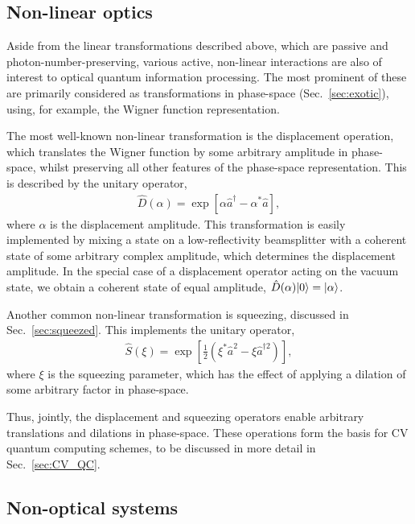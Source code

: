 %
%

\subsection{Non-linear optics} \label{sec:non_lin_opt} 

Aside from the linear transformations described above, which are passive and photon-number-preserving, various active, non-linear interactions are also of interest to optical quantum information processing. The most prominent of these are primarily considered as transformations in phase-space (Sec.~\ref{sec:exotic}), using, for example, the Wigner function representation.

The most well-known non-linear transformation is the displacement operation, which translates the Wigner function by some arbitrary amplitude in phase-space, whilst preserving all other features of the phase-space representation. This is described by the unitary operator,
\begin{align}
\hat{D}(\alpha) = \exp \left[\alpha\hat{a}^\dag - \alpha^*\hat{a}\right],
\end{align}
where $\alpha$ is the displacement amplitude. This transformation is easily implemented by mixing a state on a low-reflectivity beamsplitter with a coherent state of some arbitrary complex amplitude, which determines the displacement amplitude. In the special case of a displacement operator acting on the vacuum state, we obtain a coherent state of equal amplitude, \mbox{$\hat{D}(\alpha)|0\rangle=|\alpha\rangle$}.

Another common non-linear transformation is squeezing, discussed in Sec.~\ref{sec:squeezed}. This implements the unitary operator,
\begin{align}
\hat{S}(\xi) = \exp \left[ \frac{1}{2}(\xi^*\hat{a}^2 - \xi{\hat{a}^{\dag 2}})\right],
\end{align}
where $\xi$ is the squeezing parameter, which has the effect of applying a dilation of some arbitrary factor in phase-space.

Thus, jointly, the displacement and squeezing operators enable arbitrary translations and dilations in phase-space. These operations form the basis for CV quantum computing schemes, to be discussed in more detail in Sec.~\ref{sec:CV_QC}.

%
%

\subsection{Non-optical systems}

